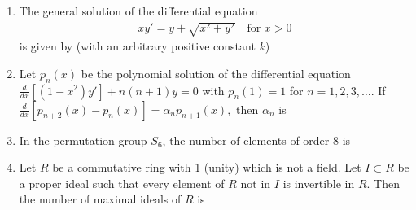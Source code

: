 \documentclass[journal,,12pt,onecolumn]{IEEEtran}
\theoremstyle{remark}
\begin{document}
\begin{enumerate}
\item The general solution of the differential equation  
\begin{align*}
    xy' = y + \sqrt{x^2 + y^2} \quad \text{for } x > 0
\end{align*}
is given by (with an arbitrary positive constant $ k $)
\begin{enumerate}
\end{enumerate}
\bigskip
\item  Let $ p_n(x) $ be the polynomial solution of the differential equation
$
\frac{d}{dx}\left[(1 - x^2)y'\right] + n(n + 1)y = 0
$
with $ p_n(1) = 1 $ for $ n = 1, 2, 3, \ldots $. If 
$
\frac{d}{dx}[p_{n + 2}(x) - p_n(x)] = \alpha_n p_{n + 1}(x),
$
then $ \alpha_n $ is 
\begin{enumerate}
\end{enumerate}
\bigskip


\item  In the permutation group $ S_6 $, the number of elements of order 8 is
\begin{enumerate}
\end{enumerate}
\bigskip

\item  Let $ R $ be a commutative ring with 1 (unity) which is not a field. Let $ I \subset R $ be a proper ideal such that every element of $ R $ not in $ I $ is invertible in $ R $. Then the number of maximal ideals of $ R $ is 
\begin{enumerate}
\end{enumerate}


\end{enumerate}
\end{document}
